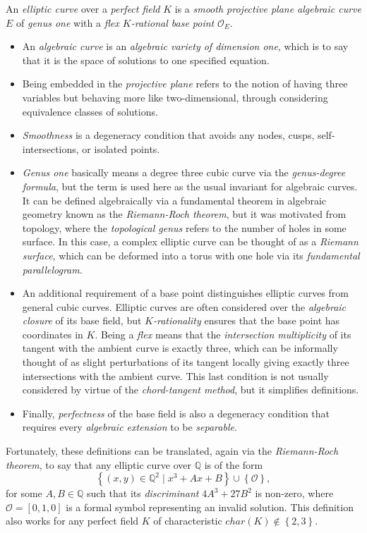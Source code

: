 \documentclass{article}
\newcommand{\rb}[1]{\left( #1 \right)}
\renewcommand{\sb}[1]{\left[ #1 \right]}
\newcommand{\cb}[1]{\left\{ #1 \right\}}
\newcommand{\Q}{\mathbb{Q}}
\newcommand{\OO}{\mathcal{O}}
\begin{document}
An \emph{elliptic curve} over a \emph{perfect field} $ K $ is a \emph{smooth projective plane algebraic curve} $ E $ of \emph{genus one} with a \emph{flex $ K $-rational base point} $ \OO_E $.
\begin{itemize}
\item An \emph{algebraic curve} is an \emph{algebraic variety of dimension one}, which is to say that it is the space of solutions to one specified equation.
\item Being embedded in the \emph{projective plane} refers to the notion of having three variables but behaving more like two-dimensional, through considering equivalence classes of solutions.
\item \emph{Smoothness} is a degeneracy condition that avoids any nodes, cusps, self-intersections, or isolated points.
\item \emph{Genus one} basically means a degree three cubic curve via the \emph{genus-degree formula}, but the term is used here as the usual invariant for algebraic curves. It can be defined algebraically via a fundamental theorem in algebraic geometry known as the \emph{Riemann-Roch theorem}, but it was motivated from topology, where the \emph{topological genus} refers to the number of holes in some surface. In this case, a complex elliptic curve can be thought of as a \emph{Riemann surface}, which can be deformed into a torus with one hole via its \emph{fundamental parallelogram}.
\item An additional requirement of a base point distinguishes elliptic curves from general cubic curves. Elliptic curves are often considered over the \emph{algebraic closure} of its base field, but \emph{$ K $-rationality} ensures that the base point has coordinates in $ K $. Being a \emph{flex} means that the \emph{intersection multiplicity} of its tangent with the ambient curve is exactly three, which can be informally thought of as slight perturbations of its tangent locally giving exactly three intersections with the ambient curve. This last condition is not usually considered by virtue of the \emph{chord-tangent method}, but it simplifies definitions.
\item Finally, \emph{perfectness} of the base field is also a degeneracy condition that requires every \emph{algebraic extension} to be \emph{separable}.
\end{itemize}
Fortunately, these definitions can be translated, again via the \emph{Riemann-Roch theorem}, to say that any elliptic curve over $ \Q $ is of the form
$$ \cb{\rb{x, y} \in \Q^2 \mid x^3 + Ax + B} \cup \cb{\OO}, $$
for some $ A, B \in \Q $ such that its \emph{discriminant} $ 4A^3 + 27B^2 $ is non-zero, where $ \OO = \sb{0, 1, 0} $ is a formal symbol representing an invalid solution. This definition also works for any perfect field $ K $ of characteristic $ char\rb{K} \notin \cb{2, 3} $.
\end{document}

